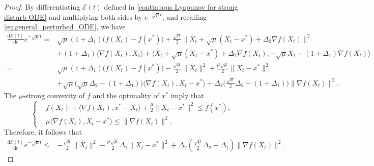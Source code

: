 \documentclass[11pt]{article}
\newcommand{\1}{\mathbf 1}
\numberwithin{equation}{section}
\begin{document}
\begin{proof}
{By differentiating $\mathcal{E}(t)$ defined in \eqref{continuous Lyapunov for strong disturb ODE} and multiplying both sides by $e^{-\sqrt{\mu}t}$, and recalling \eqref{eq:general_perturbed_ODE}, we have
\begin{equation*}
    \begin{aligned}
        \frac{\mathrm{d}
        \mathcal{E}(t)}{\mathrm{d} t}e^{-\sqrt{\mu}t}
        =&\sqrt{\mu}(1+\Delta_1)\big(f(X_t)-f(x^*)\big)+\frac{\sqrt{\mu}}{2}\|\dot{X_t}+\sqrt{\mu}(X_t-x^*)+\Delta_2\nabla f(X_t)\|^2\\
        &+(1+\Delta_1)\langle \nabla f(X_t),\dot{X_t} \rangle+\langle \dot{X_t}+\sqrt{\mu}(X_t-x^*)+\Delta_2\nabla f(X_t),-\sqrt{\mu}\dot{X_t}-(1+\Delta_1)\nabla f(X_t)\rangle\\
        =&\sqrt{\mu}(1+\Delta_1)\big(f(X_t)-f(x^*)\big)-\frac{\sqrt{\mu}}{2}\|\dot{X_t}\|^2+\frac{\mu\sqrt{\mu}}{2}\|X_t-x^*\|^2
        \\&+\sqrt{\mu}\big(\sqrt{\mu}\Delta_2-(1+\Delta_1)\big)\langle \nabla f(X_t), X_t-x^*\rangle +\Delta_2\big(\frac{\sqrt{\mu}}{2}\Delta_2-(1+\Delta_1)\big)\|\nabla f(X_t)\|^2.
    \end{aligned}
\end{equation*}
}
The $\mu$-strong convexity of $f$ and the optimality of $x^*$ imply that
\begin{equation*}
    \left\{
    \begin{aligned}
        & f(X_t)+\langle \nabla f(X_t), x^*-X_t \rangle + \frac{\mu}{2}\|X_t-x^*\|^2 \leqslant f(x^*),\\
        & \mu \langle \nabla f(X_t), X_t-x^* \rangle  \leqslant \|\nabla f(X_t)\|^2.
    \end{aligned}
    \right. 
\end{equation*}
Therefore, it follows that
\begin{align}
    \frac{\mathrm{d} \mathcal{E}(t)}{\mathrm{d} t}e^{-\sqrt{\mu}t}
        \leqslant & -\frac{\sqrt{\mu}}{2}\|\dot{X_t}\|^2-\frac{\mu\sqrt{\mu}}{2}\Delta_1\|X_t-x^*\|^2+\Delta_2(\frac{\sqrt{\mu}}{2}\Delta_2-\Delta_1)\|\nabla f(X_t)\|^2 \label{eq: proof process of theorem 1}.
\end{align}

\end{proof}
\end{document}
